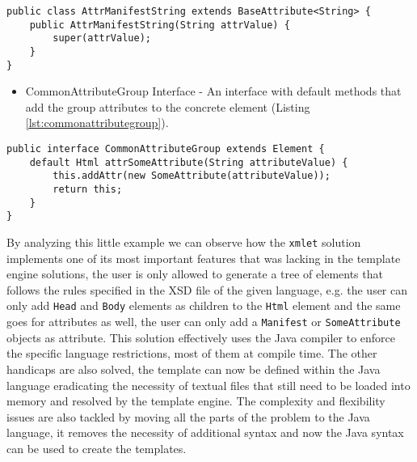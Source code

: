 \bigskip


\begin{minipage}{\linewidth}
\begin{lstlisting}[caption={Manifest Attribute Class},captionpos=b,label={lst:manifestattributeclass}]
public class AttrManifestString extends BaseAttribute<String> {
    public AttrManifestString(String attrValue) {
        super(attrValue);
    }
}
\end{lstlisting}
\end{minipage}

\begin{itemize}
	\item CommonAttributeGroup Interface - An interface with default methods that add the group attributes to the concrete element (Listing \ref{lst:commonattributegroup}).
\end{itemize}

\bigskip


\begin{minipage}{\linewidth}
\begin{lstlisting}[caption={CommonAttributeGroup Interface},captionpos=b,label={lst:commonattributegroup}]
public interface CommonAttributeGroup extends Element {
    default Html attrSomeAttribute(String attributeValue) {
        this.addAttr(new SomeAttribute(attributeValue));
        return this;
    }
}
\end{lstlisting}
\end{minipage}

\noindent
By analyzing this little example we can observe how the \texttt{xmlet} solution implements one of its most important features that was lacking in the template engine solutions, the user is only allowed to generate a tree of elements that follows the rules specified in the \ac{XSD} file of the given language, e.g. the user can only add \texttt{Head} and \texttt{Body} elements as children to the \texttt{Html} element and the same goes for attributes as well, the user can only add a \texttt{Manifest} or \texttt{SomeAttribute} objects as attribute. This solution effectively uses the Java compiler to enforce the specific language restrictions, most of them at compile time. The other handicaps are also solved, the template can now be defined within the Java language eradicating the necessity of textual files that still need to be loaded into memory and resolved by the template engine. The complexity and flexibility issues are also tackled by moving all the parts of the problem to the Java language, it removes the necessity of additional syntax and now the Java syntax can be used to create the templates.

